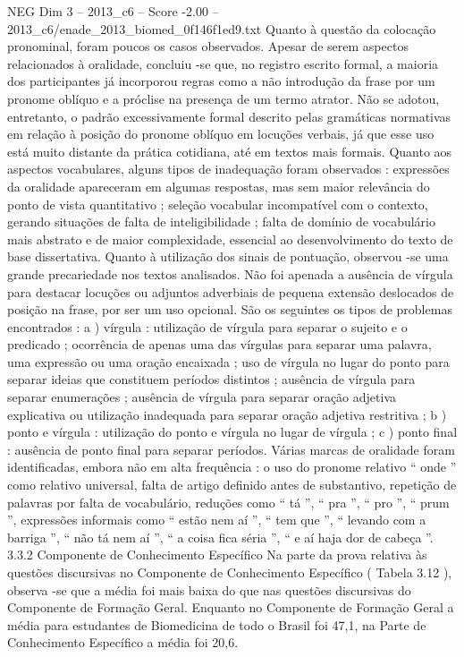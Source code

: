 \begin{textsample}{NEG Dim 3 – 2013\_c6 – Score -2.00 – 2013\_c6/enade\_2013\_biomed\_0f146f1ed9.txt}
Quanto à questão da colocação pronominal, foram poucos os casos observados.
Apesar de serem aspectos relacionados à oralidade, concluiu -se que, no registro escrito formal, a maioria dos participantes já incorporou regras como a não introdução da frase por um pronome oblíquo e a próclise na presença de um termo atrator.
Não se adotou, entretanto, o padrão excessivamente formal descrito pelas gramáticas normativas em relação à posição do pronome oblíquo em locuções verbais, já que esse uso está muito distante da prática cotidiana, até em textos mais formais.
Quanto aos aspectos vocabulares, alguns tipos de inadequação foram observados : expressões da oralidade apareceram em algumas respostas, mas sem maior relevância do ponto de vista quantitativo ; seleção vocabular incompatível com o contexto, gerando situações de falta de inteligibilidade ; falta de domínio de vocabulário mais abstrato e de maior complexidade, essencial ao desenvolvimento do texto de base dissertativa.
Quanto à utilização dos sinais de pontuação, observou -se uma grande precariedade nos textos analisados.
Não foi apenada a ausência de vírgula para destacar locuções ou adjuntos adverbiais de pequena extensão deslocados de posição na frase, por ser um uso opcional.
São os seguintes os tipos de problemas encontrados : a ) vírgula : utilização de vírgula para separar o sujeito e o predicado ; ocorrência de apenas uma das vírgulas para separar uma palavra, uma expressão ou uma oração encaixada ; uso de vírgula no lugar do ponto para separar ideias que constituem períodos distintos ; ausência de vírgula para separar enumerações ; ausência de vírgula para separar oração adjetiva explicativa ou utilização inadequada para separar oração adjetiva restritiva ; b ) ponto e vírgula : utilização do ponto e vírgula no lugar de vírgula ; c ) ponto final : ausência de ponto final para separar períodos.
Várias marcas de oralidade foram identificadas, embora não em alta frequência : o uso do pronome relativo “ onde ” como relativo universal, falta de artigo definido antes de substantivo, repetição de palavras por falta de vocabulário, reduções como “ tá ”, “ pra ”, “ pro ”, “ prum ”, expressões informais como “ estão nem aí ”, “ tem que ”, “ levando com a barriga ”, “ não tá nem aí ”, “ a coisa fica séria ”, “ e aí haja dor de cabeça ”. 3.3.2 Componente de Conhecimento Específico Na parte da prova relativa às questões discursivas no Componente de Conhecimento Específico ( Tabela 3.12 ), observa -se que a média foi mais baixa do que nas questões discursivas do Componente de Formação Geral.
Enquanto no Componente de Formação Geral a média para estudantes de Biomedicina de todo o Brasil foi 47,1, na Parte de Conhecimento Específico a média foi 20,6.

\end{textsample}
